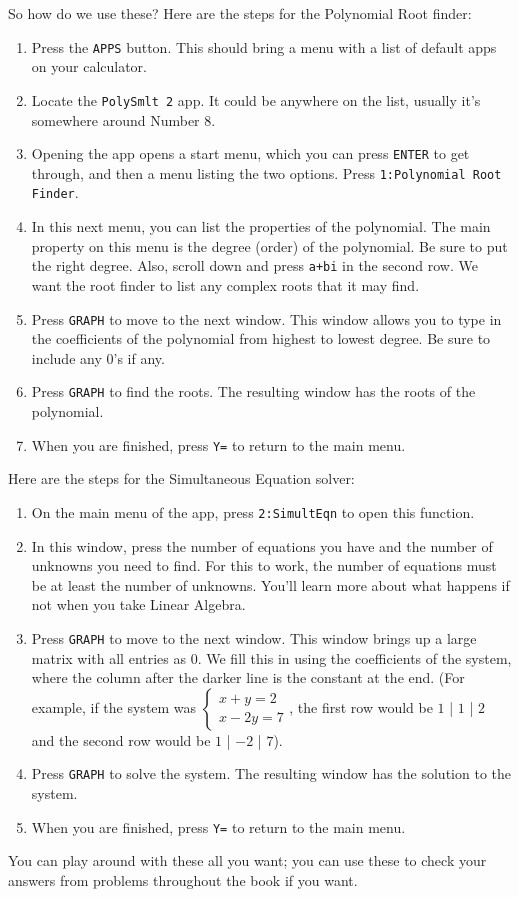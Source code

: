 \documentclass[lang=en,11pt]{elegantbook}
\begin{document}
So how do we use these?  Here are the steps for the Polynomial Root finder:\begin{enumerate}
    \item Press the \texttt{APPS} button.  This should bring a menu with a list of default apps on your calculator.
    \item Locate the \texttt{PolySmlt 2} app.  It could be anywhere on the list, usually it's somewhere around Number 8.
    \item Opening the app opens a start menu, which you can press \texttt{ENTER} to get through, and then a menu listing the two options.  Press \texttt{1:Polynomial Root Finder}.
    \item In this next menu, you can list the properties of the polynomial.  The main property on this menu is the degree (order) of the polynomial. Be sure to put the right degree.  Also, scroll down and press \texttt{a+bi} in the second row.  We want the root finder to list any complex roots that it may find.
    \item Press \texttt{GRAPH} to move to the next window.  This window allows you to type in the coefficients of the polynomial from highest to lowest degree.  Be sure to include any $0$'s if any.
    \item Press \texttt{GRAPH} to find the roots.  The resulting window has the roots of the polynomial.
    \item When you are finished, press \texttt{Y=} to return to the main menu.
\end{enumerate}
Here are the steps for the Simultaneous Equation solver: \begin{enumerate}
    \item On the main menu of the app, press \texttt{2:SimultEqn} to open this function.
    \item In this window, press the number of equations you have and the number of unknowns you need to find.  For this to work, the number of equations must be at least the number of unknowns.  You'll learn more about what happens if not when you take Linear Algebra.
    \item Press \texttt{GRAPH} to move to the next window.  This window brings up a large matrix with all entries as $0$.  We fill this in using the coefficients of the system, where the column after the darker line is the constant at the end.  (For example, if the system was $\begin{cases} x+y=2 \\ x-2y=7\end{cases}$, the first row would be $1$ | $1$ | $2$ and the second row would be $1$ | $-2$ | $7$).
    \item Press \texttt{GRAPH} to solve the system. The resulting window has the solution to the system.
    \item When you are finished, press \texttt{Y=} to return to the main menu.
\end{enumerate}
You can play around with these all you want; you can use these to check your answers from problems throughout the book if you want.
\end{document}
